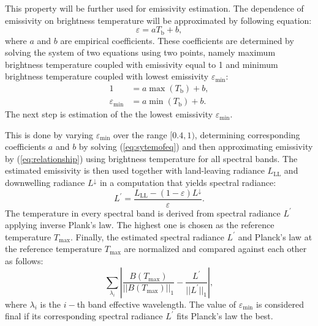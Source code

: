 This property will be further used for emissivity estimation. The dependence of emissivity on brightness temperature will be approximated by following equation:
\begin{equation} \varepsilon = a T_\mathrm{b} + b, \label{eq:relationship}\end{equation}
where $a$ and $b$ are empirical coefficients. These coefficients are determined by solving the system of two equations using two points, namely maximum brightness temperature coupled with emissivity equal to 1 and minimum brightness temperature coupled with lowest emissivity $\varepsilon_\mathrm{min}$:
\begin{equation}
\begin{aligned}
	1 &= a \max (T_\mathrm{b}) + b, \\
	\varepsilon_\mathrm{min} &= a \min (T_\mathrm{b}) + b.
\end{aligned}
\label{eq:sytemofeq}
\end{equation}
The next step is estimation of the the lowest emissivity $\varepsilon_\mathrm{min}$.

This is done by varying $\varepsilon_\mathrm{min}$ over the range $[0.4,1)$, determining corresponding coefficients $a$ and $b$ by solving (\ref{eq:sytemofeq}) and then approximating emissivity by (\ref{eq:relationship}) using brightness temperature for all spectral bands. The estimated emissivity is then used together with land-leaving radiance $L_\mathrm{LL}$ and downwelling radiance $L^\downarrow$ in a computation that yields spectral radiance:
\begin{equation}
	L^{\prime} = \frac{L_\mathrm{LL}-(1-\varepsilon)L^\downarrow}{\varepsilon}.
\end{equation}
The temperature in every spectral band is derived from spectral radiance $L^{\prime}$ applying inverse Plank's law. The highest one is chosen as the reference temperature $T_\mathrm{max}$. Finally, the estimated spectral radiance $L^{\prime}$ and Planck's law at the reference temperature $T_\mathrm{max}$ are normalized and compared against each other as follows:
\begin{equation}
	\sum_{\lambda_i} \left| \frac{B(T_\mathrm{max})}{||B(T_\mathrm{max})||_1} - \frac{L^\prime}{||L^\prime||_1} \right|,
\end{equation}
where $\lambda_i$ is the $i-$th band effective wavelength. The value of $\varepsilon_\mathrm{min}$ is considered final if its corresponding spectral radiance $L^{\prime}$ fits Planck's law the best.

